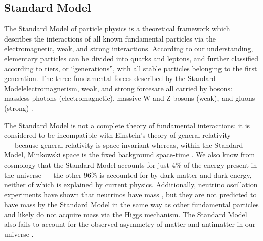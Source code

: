 \subsection{Standard Model}
The Standard Model of particle physics is a theoretical framework which describes the interactions of all known fundamental particles via the electromagnetic, weak, and strong interactions. According to our understanding, elementary particles can be divided into quarks and leptons, and further classified according to tiers, or ``generations'', with all stable particles belonging to the first generation. The three fundamental forces described by the Standard Model\textendash electromagnetism, weak, and strong forces\textendash are all carried by bosons: massless photons (electromagnetic), massive W and Z bosons (weak), and gluons (strong) \cite{CERN:SM:Online}.

The Standard Model is not a complete theory of fundamental interactions: it is considered to be incompatible with Einstein's theory of general relativity — because general relativity is space-invariant whereas, within the Standard Model, Minkowski space is the fixed background space-time \cite{Colosi:2005:CQG}. We also know from cosmology that the Standard Model accounts for just 4\% of the energy present in the universe — the other 96\% is accounted for by dark matter and dark energy, neither of which is explained by current physics\cite{Krauss:2009:Conference}. Additionally, neutrino oscillation experiments have shown that neutrinos have mass \cite{Fukuda:1998:Kamiokande}, but they are not predicted to have mass by the Standard Model in the same way as other fundamental particles and likely do not acquire mass via the Higgs mechanism. The Standard Model also fails to account for the observed asymmetry of matter and antimatter in our universe \cite{Sather:1999:MatterA}.

